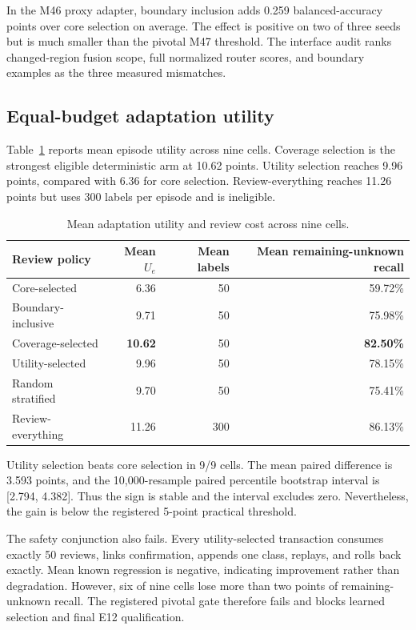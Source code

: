 \documentclass[10pt]{article}
\newcommand{\utility}{U}
\begin{document}
In the M46 proxy adapter, boundary inclusion adds 0.259 balanced-accuracy
points over core selection on average. The effect is positive on two of three
seeds but is much smaller than the pivotal M47 threshold. The interface audit
ranks changed-region fusion scope, full normalized router scores, and boundary
examples as the three measured mismatches.

\subsection{Equal-budget adaptation utility}

Table~\ref{tab:utility} reports mean episode utility across nine cells.
Coverage selection is the strongest eligible deterministic arm at 10.62
points. Utility selection reaches 9.96 points, compared with 6.36 for core
selection. Review-everything reaches 11.26 points but uses 300 labels per
episode and is ineligible.

\begin{table}[t]
\centering
\caption{Mean adaptation utility and review cost across nine cells.}
\label{tab:utility}
\begin{tabular}{lrrr}
\toprule
Review policy & Mean $\utility_e$ & Mean labels & Mean remaining-unknown recall \\
\midrule
Core-selected & 6.36 & 50 & 59.72\% \\
Boundary-inclusive & 9.71 & 50 & 75.98\% \\
Coverage-selected & \textbf{10.62} & 50 & \textbf{82.50\%} \\
Utility-selected & 9.96 & 50 & 78.15\% \\
Random stratified & 9.70 & 50 & 75.41\% \\
Review-everything & 11.26 & 300 & 86.13\% \\
\bottomrule
\end{tabular}
\end{table}

Utility selection beats core selection in 9/9 cells. The mean paired
difference is 3.593 points, and the 10,000-resample paired percentile
bootstrap interval is [2.794, 4.382]. Thus the sign is stable and the interval
excludes zero. Nevertheless, the gain is below the registered 5-point practical
threshold.

The safety conjunction also fails. Every utility-selected transaction consumes
exactly 50 reviews, links confirmation, appends one class, replays, and rolls
back exactly. Mean known regression is negative, indicating improvement rather
than degradation. However, six of nine cells lose more than two points of
remaining-unknown recall. The registered pivotal gate therefore fails and
blocks learned selection and final E12 qualification.
\end{document}
